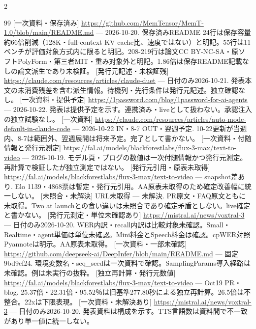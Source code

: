 \documentclass[lualatex,a4paper,10pt]{jlreq}
\begin{document}
\begin{multicols}{2}
{\begin{thebibliography}{99}
 [一次資料・保存済み] \url{https://github.com/MemTensor/MemT-1.0/blob/main/README.md} --- 2026-10-20. 保存済みREADME 24行は保存容量約66倍削減（128K・full-context KV cache比、速度ではない）と明記。55行は11ベンチが評価対象方式内に限ると明記。208-219行は論文CC BY-NC-SA・原ソフトPolyForm・第三者MIT・重み対象外と明記。1.86倍は保存README記載なしの論文派生であり未検証。
 [発行元記述・未検証残] \url{https://claude.com/resources/articles/claude-duet} --- 日付のみ2026-10-21. 発表本文の未消費残差を含む派生情報。待機列・先行条件は発行元記述。独立確認なし。
 [一次資料・提供予定] \url{https://1password.com/blog/1password-for-ai-agents} --- 2026-10-22. 発表は提供予定を示す。連携済み・liveとして扱わない。承認注入の独立試験なし。
 [一次資料] \url{https://claude.com/resources/articles/auto-mode-default-in-claude-code} --- 2026-10-22 IN・8-7 OUT・翌週予定. 10-22更新が当週内、8-7は範囲外、翌週展開は将来予定。完了として書かない。
 [一次資料・付随情報と発行元測定] \url{https://fal.ai/models/blackforestlabs/flux-3-max/text-to-video} --- 2026-10-19. モデル頁・ブログの数値は一次付随情報かつ発行元測定。再計算で検証したが独立測定ではない。
 [発行元引用・原表未取得] \url{https://fal.ai/models/blackforestlabs/flux-3-max/text-to-video} --- snapshot差あり. Elo 1139・4868票は暫定・発行元引用。AA原表未取得のため確定改善幅に統一しない。
 [未照合・未解決] URL未取得 --- 未解決. PR原文・FAQ原文ともに未取得。Two at launchとの食い違いは未照合であり確定矛盾としない。live確定と書かない。
 [発行元測定・単位未確認あり] \url{https://mistral.ai/news/voxtral-3} --- 日付のみ2026-10-20. WER内訳・recall内訳は比較対象未確認。Small・Realtime・agent単価は単位未確認。Mini料金とSpeech料金は確認。cpWER対照Pyannoteは明示。AA原表未取得。
 [一次資料・一部未確認] \url{https://github.com/deepseek-ai/DeepInfer/blob/main/README.md} --- 固定9bd9cf24. 環境変数名・seq\_seedは一次資料で確認。SamplingParams導入経路は未確認。例は未実行の抜粋。
 [独立再計算・発行元数値] \url{https://fal.ai/models/blackforestlabs/flux-3-max/text-to-video} --- Oct19 PR・blog. 25.37倍・22.31倍・95.52％は旧基準277.80秒による独立再計算。26.5倍は不整合。22xは下限表現。
 [一次資料・未解決あり] \url{https://mistral.ai/news/voxtral-3} --- 日付のみ2026-10-20. 発表資料は構成を示す。TTS言語数は資料間で不一致があり単一値に統一しない。

\end{thebibliography}}
\end{multicols}
\end{document}
